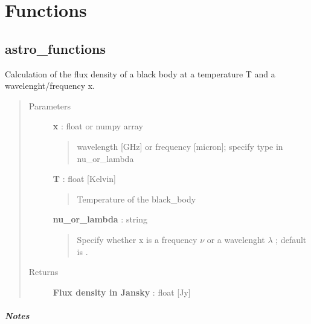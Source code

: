 \documentclass[a4paper,10pt,english]{sphinxmanual}
\begin{document}
\chapter{Functions}
\label{functions:functions}\label{functions::doc}

\section{astro\_functions}
\label{functions:astro-functions}\label{functions:module-astrolyze.functions.astro_functions}

\begin{fulllineitems}
\label{functions:astrolyze.functions.astro_functions.black_body}
Calculation of the flux density of a black body at a temperature T and a
wavelenght/frequency x.
\begin{quote}\begin{description}
\item[{Parameters }] \leavevmode
\textbf{x} : float or numpy array
\begin{quote}

wavelength {[}GHz{]} or frequency {[}micron{]};  specify type in nu\_or\_lambda
\end{quote}

\textbf{T} : float {[}Kelvin{]}
\begin{quote}

Temperature of the black\_body
\end{quote}

\textbf{nu\_or\_lambda} : string
\begin{quote}

Specify whether x is a frequency $\nu$  or a wavelenght
$\lambda$ ; default is .
\end{quote}

\item[{Returns }] \leavevmode
\textbf{Flux density in Jansky} : float {[}Jy{]}

\end{description}\end{quote}
\paragraph{Notes}


\end{fulllineitems}
\end{document}
